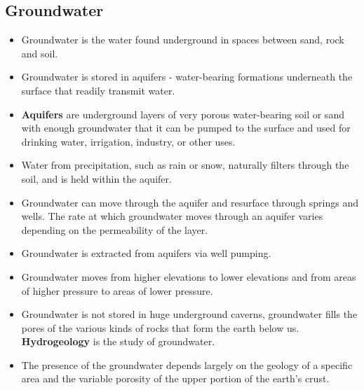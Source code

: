 \subsection{Groundwater}
\begin{itemize}
\item Groundwater is the water found underground in spaces between sand, rock and soil. 
\item Groundwater is stored in aquifers - water-bearing formations underneath the surface that readily transmit water. 
\item \textbf{Aquifers}  are underground layers of very porous water-bearing soil or sand with enough groundwater that it can be pumped to the surface and used for drinking water, irrigation, industry, or other uses.
\item Water from precipitation, such as rain or snow, naturally filters through the soil, and is held within the aquifer. 
\item Groundwater can move through the aquifer and resurface through springs and wells.  The rate at which groundwater moves through an aquifer varies depending on the permeability of the layer.
\item Groundwater is extracted from aquifers via well pumping.
\item Groundwater moves from higher elevations to lower elevations and from areas of higher pressure to areas of lower pressure.
\item Groundwater is not stored in huge underground caverns, groundwater fills the pores of the various kinds of rocks that form the earth below us. \textbf{Hydrogeology} is the study of groundwater.
\item The presence of the groundwater depends largely on the geology of a specific area and the variable porosity of the upper portion of the earth’s crust. 


\end{itemize}
